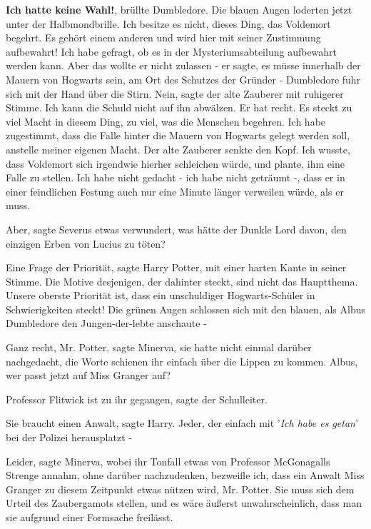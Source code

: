 \glqq \textbf{Ich hatte keine Wahl!}\grqq{}, brüllte Dumbledore. Die blauen
Augen loderten jetzt unter der Halbmondbrille. \glqq Ich besitze es nicht,
dieses Ding, das Voldemort begehrt. Es gehört einem anderen und wird hier mit
seiner Zustimmung aufbewahrt! Ich habe gefragt, ob es in der Mysteriumsabteilung
aufbewahrt werden kann. Aber das wollte er nicht zulassen - er sagte, es müsse
innerhalb der Mauern von Hogwarts sein, am Ort des Schutzes der Gründer -\grqq{}
Dumbledore fuhr sich mit der Hand über die Stirn. \glqq Nein\grqq{}, sagte der
alte Zauberer mit ruhigerer Stimme. \glqq Ich kann die Schuld nicht auf ihn
abwälzen. Er hat recht. Es steckt zu viel Macht in diesem Ding, zu viel, was die
Menschen begehren. Ich habe zugestimmt, dass die Falle hinter die Mauern von
Hogwarts gelegt werden soll, anstelle meiner eigenen Macht.\grqq{} Der alte
Zauberer senkte den Kopf. \glqq Ich wusste, dass Voldemort sich irgendwie
hierher schleichen würde, und plante, ihm eine Falle zu stellen. Ich habe nicht
gedacht - ich habe nicht geträumt -, dass er in einer feindlichen Festung auch
nur eine Minute länger verweilen würde, als er muss.\grqq{}

\glqq Aber\grqq{}, sagte Severus etwas verwundert, \glqq was hätte der Dunkle
Lord davon, den einzigen Erben von Lucius zu töten?\grqq{}

\glqq Eine Frage der Priorität\grqq{}, sagte Harry Potter, mit einer harten
Kante in seiner Stimme. \glqq Die Motive desjenigen, der dahinter steckt, sind
nicht das Hauptthema. Unsere oberste Priorität ist, dass ein unschuldiger
Hogwarts-Schüler in Schwierigkeiten steckt!\grqq{} Die grünen Augen schlossen
sich mit den blauen, als Albus Dumbledore den Jungen-der-lebte anschaute -

\glqq Ganz recht, Mr. Potter\grqq{}, sagte Minerva, sie hatte nicht einmal
darüber nachgedacht, die Worte schienen ihr einfach über die Lippen zu kommen.
\glqq Albus, wer passt jetzt auf Miss Granger auf?\grqq{}

\glqq Professor Flitwick ist zu ihr gegangen\grqq{}, sagte der Schulleiter.

\glqq Sie braucht einen Anwalt\grqq{}, sagte Harry. \glqq Jeder, der einfach mit
'\emph{Ich habe es getan}' bei der Polizei herausplatzt -\grqq{}

\glqq Leider\grqq{}, sagte Minerva, wobei ihr Tonfall etwas von Professor
McGonagalls Strenge annahm, ohne darüber nachzudenken, \glqq bezweifle ich, dass
ein Anwalt Miss Granger zu diesem Zeitpunkt etwas nützen wird, Mr. Potter. Sie
muss sich dem Urteil des Zaubergamots stellen, und es wäre äußerst
unwahrscheinlich, dass man sie aufgrund einer Formsache freilässt.\grqq{}

